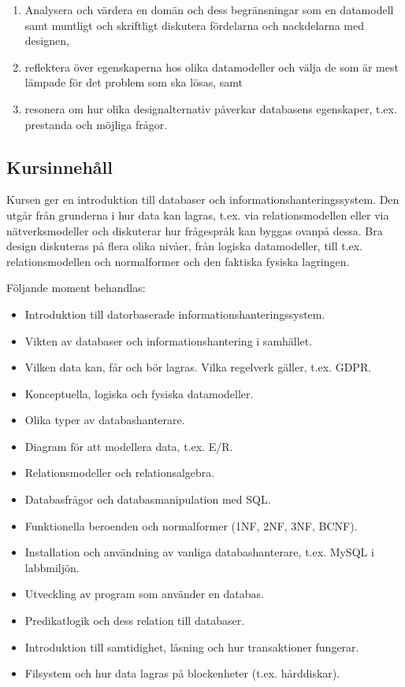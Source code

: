 \begin{enumerate}
  \begin{enumerate}
  \def\labelenumii{\Alph{enumi}.\arabic{enumii}.}
  \tightlist
  \item
    Analysera och värdera en domän och dess begränsningar som en
    datamodell samt muntligt och skriftligt diskutera fördelarna och
    nackdelarna med designen,
  \item
    reflektera över egenskaperna hos olika datamodeller och välja de som
    är mest lämpade för det problem som ska lösas, samt
  \item
    resonera om hur olika designalternativ påverkar databasens
    egenskaper, t.ex. prestanda och möjliga frågor.
  \end{enumerate}
\end{enumerate}

\subsection*{Kursinnehåll}

Kursen ger en introduktion till databaser och
informationshanteringssystem. Den utgår från grunderna i hur data kan
lagras, t.ex. via relationsmodellen eller via nätverksmodeller och
diskuterar hur frågespråk kan byggas ovanpå dessa. Bra design diskuteras
på flera olika nivåer, från logiska datamodeller, till t.ex.
relationsmodellen och normalformer och den faktiska fysiska lagringen.

Följande moment behandlas:

\begin{itemize}
\tightlist
\item
  Introduktion till datorbaserade informationshanteringssystem.
\item
  Vikten av databaser och informationshantering i samhället.
\item
  Vilken data kan, får och bör lagras. Vilka regelverk gäller, t.ex.
  GDPR.
\item
  Konceptuella, logiska och fysiska datamodeller.
\item
  Olika typer av databashanterare.
\item
  Diagram för att modellera data, t.ex. E/R.
\item
  Relationsmodeller och relationsalgebra.
\item
  Databasfrågor och databasmanipulation med SQL.
\item
  Funktionella beroenden och normalformer (1NF, 2NF, 3NF, BCNF).
\item
  Installation och användning av vanliga databashanterare, t.ex. MySQL i
  labbmiljön.
\item
  Utveckling av program som använder en databas.
\item
  Predikatlogik och dess relation till databaser.
\item
  Introduktion till samtidighet, låsning och hur transaktioner fungerar.
\item
  Filsystem och hur data lagras på blockenheter (t.ex. hårddiskar).
\end{itemize}

